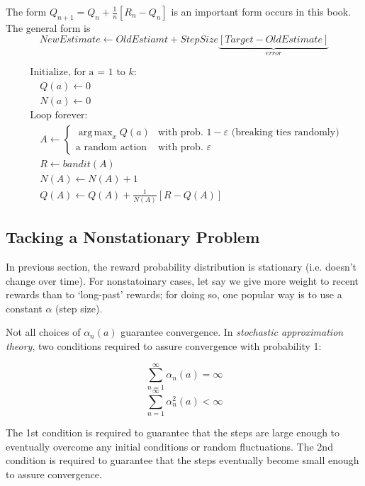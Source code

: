 \documentclass[lang=en,mode=geye,device=normal,color=blue,14pt]{elegantnote}
\DeclareMathOperator*{\1}{\mathbbm{1}}
\DeclareMathOperator*{\argmax}{arg\,max}
\begin{document}
The form $Q_{n+1} = Q_n + \frac{1}{n}[R_n - Q_n]$ is an important form occurs in this book. The general form is
$$ NewEstimate \leftarrow OldEstiamt + StepSize\underbrace{[Target - OldEstimate]}_{error} $$

\begin{tcolorbox}[width=\textwidth,title={A simple bandit algorithm}]
	\begin{align*}
	   & \text{Initialize, for a = 1 to }k: \\
	   & \quad Q(a) \leftarrow 0 \\
	   & \quad N(a) \leftarrow 0 \\
	   & \text{Loop forever: }\\
	   & \quad A \leftarrow \left\{
	    \begin{array}{ll}
	        \argmax_x Q(a) & \text{with prob. } 1 - \varepsilon \text{ (breaking ties randomly) }\\
	        \text{a random action} & \text{with prob. } \varepsilon
	    \end{array}
	\right. \\
	   & \quad R \leftarrow bandit(A) \\
	   & \quad N(A) \leftarrow N(A) + 1 \\
	   & \quad Q(A) \leftarrow Q(A) + \frac{1}{N(A)}[R-Q(A)]
	\end{align*}
\end{tcolorbox}

\subsection{Tacking a Nonstationary Problem}

In previous section, the reward probability distribution is stationary (i.e. doesn't change over time).
For nonstatoinary cases, let say we give more weight to recent rewards than to `long-past' rewards; for doing so, one popular way is to use a constant $\alpha$ (step size).

Not all choices of $\alpha_n(a)$ guarantee convergence.
In \textit{stochastic approximation theory}, two conditions required to assure convergence with probability 1:

$$ \sum_{n=1}^\infty \alpha_n(a) = \infty $$
$$ \sum_{n=1}^\infty \alpha_n^2(a) < \infty $$

The 1st condition is required to guarantee that the steps are large enough to eventually overcome any initial conditions or random fluctuations.
The 2nd condition is required to guarantee that the steps eventually become small enough to assure convergence.
\end{document}
